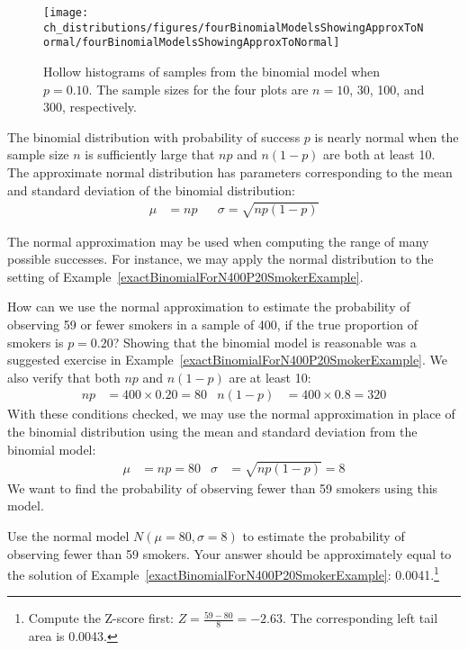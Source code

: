 \begin{figure}[h]
\centering
\texttt{[image: ch\_distributions/figures/fourBinomialModelsShowingApproxToNormal/fourBinomialModelsShowingApproxToNormal]}
\caption{Hollow histograms of samples from the binomial model when $p=0.10$. The sample sizes for the four plots are $n=10$, 30, 100, and 300, respectively.}
\label{fourBinomialModelsShowingApproxToNormal}
\end{figure}

\begin{termBox}{
The binomial distribution with probability of success $p$ is nearly normal when the sample size $n$ is sufficiently large that $np$ and $n(1-p)$ are both at least 10. The approximate normal distribution has parameters corresponding to the mean and standard deviation of the binomial distribution:\vspace{-1.5mm}
\begin{align*}
\mu &= np
&&\sigma= \sqrt{np(1-p)}
\end{align*}}
\end{termBox}

The normal approximation may be used when computing the range of many possible successes. For instance, we may apply the normal distribution to the setting of Example~\ref{exactBinomialForN400P20SmokerExample}.

\begin{example}{How can we use the normal approximation to estimate the probability of observing 59 or fewer smokers in a sample of 400, if the true proportion of smokers is $p=0.20$?} \label{approxBinomialForN400P20SmokerExample}
Showing that the binomial model is reasonable was a suggested exercise in Example~\ref{exactBinomialForN400P20SmokerExample}. We also verify that both $np$ and $n(1-p)$ are at least 10:
\begin{align*}
np&=400\times 0.20=80
&n(1-p)&=400\times 0.8=320
\end{align*}
With these conditions checked, we may use the normal approximation in place of the binomial distribution using the mean and standard deviation from the binomial model:
\begin{align*}
\mu &= np = 80
&\sigma &= \sqrt{np(1-p)} = 8
\end{align*}
We want to find the probability of observing fewer than 59 smokers using this model.
\end{example}

\begin{exercise}
Use the normal model $N(\mu=80, \sigma=8)$ to estimate the probability of observing fewer than 59 smokers. Your answer should be approximately equal to the solution of Example~\ref{exactBinomialForN400P20SmokerExample}: 0.0041.\footnote{Compute the Z-score first: $Z=\frac{59 - 80}{8} = -2.63$. The corresponding left tail area is 0.0043.}
\end{exercise}


